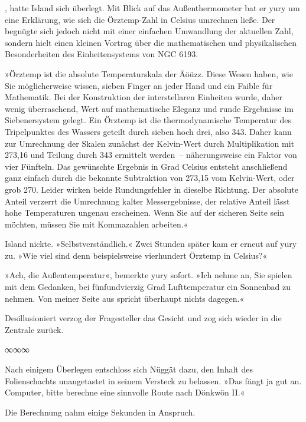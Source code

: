 , hatte Island sich überlegt. Mit Blick auf das Außenthermometer bat er yury um eine Erklärung, wie sich die Örztemp-Zahl in Celsius umrechnen ließe. Der begnügte sich jedoch nicht mit einer einfachen Umwandlung der aktuellen Zahl, sondern hielt einen kleinen Vortrag über die mathematischen und physikalischen Besonderheiten des Einheitensystems von NGC 6193.

»Örztemp ist die absolute Temperaturskala der Äöüzz. Diese Wesen haben, wie Sie möglicherweise wissen, sieben Finger an jeder Hand und ein Faible für Mathematik. Bei der Konstruktion der interstellaren Einheiten wurde, daher wenig überraschend, Wert auf mathematische Eleganz und runde Ergebnisse im Siebenersystem gelegt. Ein Örztemp ist die thermodynamische Temperatur des Tripelpunktes des Wassers geteilt durch sieben hoch drei, also 343. Daher kann zur Umrechnung der Skalen zunächst der Kelvin-Wert durch Multiplikation mit 273,16 und Teilung durch 343 ermittelt werden~– näherungsweise ein Faktor von vier Fünfteln. Das gewünschte Ergebnis in Grad Celsius entsteht anschließend ganz einfach durch die bekannte Subtraktion von 273,15 vom Kelvin-Wert, oder grob 270. Leider wirken beide Rundungsfehler in dieselbe Richtung. Der absolute Anteil verzerrt die Umrechnung kalter Messergebnisse, der relative Anteil lässt hohe Temperaturen ungenau erscheinen. Wenn Sie auf der sicheren Seite sein möchten, müssen Sie mit Kommazahlen arbeiten.«

Island nickte. »Selbstverständlich.« Zwei Stunden später kam er erneut auf yury zu. »Wie viel sind denn beispielsweise vierhundert Örztemp in Celsius?«

»Ach, die Außentemperatur«, bemerkte yury sofort. »Ich nehme an, Sie spielen mit dem Gedanken, bei fünfundvierzig Grad Lufttemperatur ein Sonnenbad zu nehmen. Von meiner Seite aus spricht überhaupt nichts dagegen.«

Desillusioniert verzog der Fragesteller das Gesicht und zog sich wieder in die Zentrale zurück.

\begin{center}
∞∞∞
\end{center}

Nach einigem Überlegen entschloss sich Nüggät dazu, den Inhalt des Folienschachts unangetastet in seinem Versteck zu belassen. »Das fängt ja gut an. Computer, bitte berechne eine sinnvolle Route nach Dönkwön II.«

Die Berechnung nahm einige Sekunden in Anspruch. 

